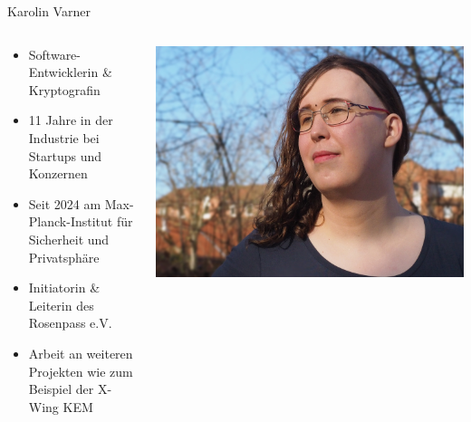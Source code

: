 \begin{frame}{Karolin Varner}
  \begin{columns}[fullwidth,c]

    \begin{column}{.7\linewidth}
      \begin{itemize}
        \item Software-Entwicklerin \& Kryptografin
        \item 11 Jahre in der Industrie bei Startups und Konzernen
        \item Seit 2024 am Max-Planck-Institut für Sicherheit und Privatsphäre
        \item Initiatorin \& Leiterin des Rosenpass e.V.
        \item Arbeit an weiteren Projekten wie zum Beispiel der X-Wing KEM
      \end{itemize}
    \end{column}%
    \begin{column}{.3\linewidth}
      \includegraphics[width=.92\linewidth,trim=200 0 100 0,clip]{graphics/karolin-varner.jpg}
    \end{column}
  \end{columns}
\end{frame}

